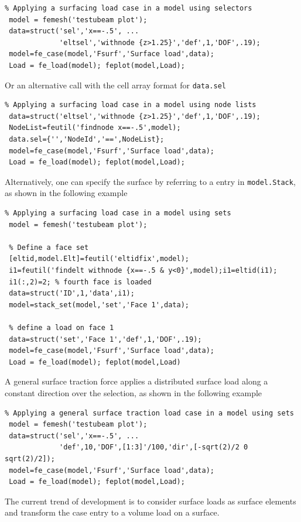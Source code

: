 \begin{verbatim}
% Applying a surfacing load case in a model using selectors
 model = femesh('testubeam plot');
 data=struct('sel','x==-.5', ... 
             'eltsel','withnode {z>1.25}','def',1,'DOF',.19);
 model=fe_case(model,'Fsurf','Surface load',data);
 Load = fe_load(model); feplot(model,Load);
\end{verbatim}%


Or an alternative call with the cell array format for {\tt data.sel}
%
\begin{verbatim}
% Applying a surfacing load case in a model using node lists
 data=struct('eltsel','withnode {z>1.25}','def',1,'DOF',.19);
 NodeList=feutil('findnode x==-.5',model);
 data.sel={'','NodeId','==',NodeList};
 model=fe_case(model,'Fsurf','Surface load',data);
 Load = fe_load(model); feplot(model,Load);
\end{verbatim}%


Alternatively, one can specify the surface by referring to a  entry in {\tt model.Stack}, as shown in the following example

\begin{verbatim}
% Applying a surfacing load case in a model using sets
 model = femesh('testubeam plot');

 % Define a face set
 [eltid,model.Elt]=feutil('eltidfix',model);
 i1=feutil('findelt withnode {x==-.5 & y<0}',model);i1=eltid(i1);
 i1(:,2)=2; % fourth face is loaded
 data=struct('ID',1,'data',i1);
 model=stack_set(model,'set','Face 1',data);

 % define a load on face 1
 data=struct('set','Face 1','def',1,'DOF',.19);
 model=fe_case(model,'Fsurf','Surface load',data);
 Load = fe_load(model); feplot(model,Load)
\end{verbatim}%

A general surface traction force applies a distributed surface load along a constant direction over the selection, as shown in the following example
\begin{verbatim}
% Applying a general surface traction load case in a model using sets
 model = femesh('testubeam plot');
 data=struct('sel','x==-.5', ... 
             'def',10,'DOF',[1:3]'/100,'dir',[-sqrt(2)/2 0 sqrt(2)/2]);
 model=fe_case(model,'Fsurf','Surface load',data);
 Load = fe_load(model); feplot(model,Load);
\end{verbatim}%


The current trend of development is to consider surface loads as surface elements and transform the case entry to a volume load on a surface.


